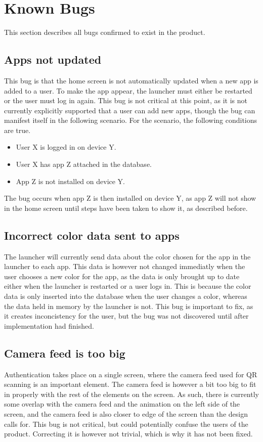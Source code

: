 \section{Known Bugs}
\label{test:known_bugs}
This section describes all bugs confirmed to exist in the product. 

\subsection{Apps not updated}
This bug is that the home screen is not automatically updated when a new app is added to a user. 
To make the app appear, the launcher must either be restarted or the user must log in again. 
This bug is not critical at this point, as it is not currently explicitly supported that a user can add new apps, though the bug can manifest itself in the following scenario.\newline
For the scenario, the following conditions are true.

\begin{itemize}
	\item User X is logged in on device Y.
	\item User X has app Z attached in the database. 
	\item App Z is not installed on device Y.
\end{itemize}

The bug occurs when app Z is then installed on device Y, as app Z will not show in the home screen until steps have been taken to show it, as described before. 

\subsection{Incorrect color data sent to apps}
The launcher will currently send data about the color chosen for the app in the launcher to each app. 
This data is however not changed immediatly when the user chooses a new color for the app, as the data is only brought up to date either when the launcher is restarted or a user logs in. 
This is because the color data is only inserted into the database when the user changes a color, whereas the data held in memory by the launcher is not. 
This bug is important to fix, as it creates inconcistency for the user, but the bug was not discovered until after implementation had finished. 

\subsection{Camera feed is too big}
Authentication takes place on a single screen, where the camera feed used for QR scanning is an important element. 
The camera feed is however a bit too big to fit in properly with the rest of the elements on the screen. 
As such, there is currently some overlap with the camera feed and the animation on the left side of the screen, and the camera feed is also closer to edge of the screen than the design calls for. \newline
This bug is not critical, but could potentially confuse the users of the product. 
Correcting it is however not trivial, which is why it has not been fixed. 